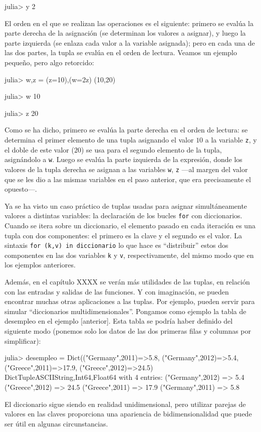 ﻿\documentclass{article}
\newcommand{\jl}{\texttt}
\begin{document}
{julia> y
2

El orden en el que se realizan las operaciones es el siguiente: primero se evalúa la parte derecha de la asignación (se determinan los valores a asignar), y luego la parte izquierda (se enlaza cada valor a la variable asignada); pero en cada una de las dos partes, la tupla se evalúa en el orden de lectura. Veamos un ejemplo pequeño, pero algo retorcido:

julia> w,z = (z=10),(w=2z)
(10,20)

julia> w
10

julia> z
20

Como se ha dicho, primero se evalúa la parte derecha en el orden de lectura: se determina el primer elemento de una tupla asignando el valor $10$ a la variable \jl{z}, y el doble de este valor ($20$) se usa para el segundo elemento de la tupla, asignándolo a \jl{w}. Luego se evalúa la parte izquierda de la expresión, donde los valores de la tupla derecha se asignan a las variables \jl{w}, \jl{z} ---al margen del valor que se les dio a las mismas variables en el paso anterior, que era precisamente el opuesto---.

Ya se ha visto un caso práctico de tuplas usadas para asignar simultáneamente valores a distintas variables: la declaración de los bucles \jl{for} con diccionarios. Cuando se itera sobre un diccionario, el elemento pasado en cada iteración es una tupla con dos componentes: el primero es la clave y el segundo es el valor. La sintaxis \jl{for (k,v) in diccionario} lo que hace es ``distribuir'' estos dos componentes en las dos variables \jl{k} y \jl{v}, respectivamente, del mismo modo que en los ejemplos anteriores.

Además, en el capítulo XXXX se verán más utilidades de las tuplas, en relación con las entradas y salidas de las funciones. Y con imaginación, se pueden encontrar muchas otras aplicaciones a las tuplas. Por ejemplo, pueden servir para simular ``diccionarios multidimensionales''. Pongamos como ejemplo la tabla de desempleo en el ejemplo [anterior]. Esta tabla se podría haber definido del siguiente modo (ponemos solo los datos de las dos primeras filas y columnas por simplificar):

julia> desempleo = Dict(("Germany",2011)=>5.8, ("Germany",2012)=>5.4,
       ("Greece",2011)=>17.9, ("Greece",2012)=>24.5)
Dict{Tuple{ASCIIString,Int64},Float64} with 4 entries:
  ("Germany",2012) => 5.4
  ("Greece",2012)  => 24.5
  ("Greece",2011)  => 17.9
  ("Germany",2011) => 5.8

El diccionario sigue siendo en realidad unidimensional, pero utilizar parejas de valores en las claves proporciona una apariencia de bidimensionalidad que puede ser útil en algunas circunstancias.



}
\end{document}
